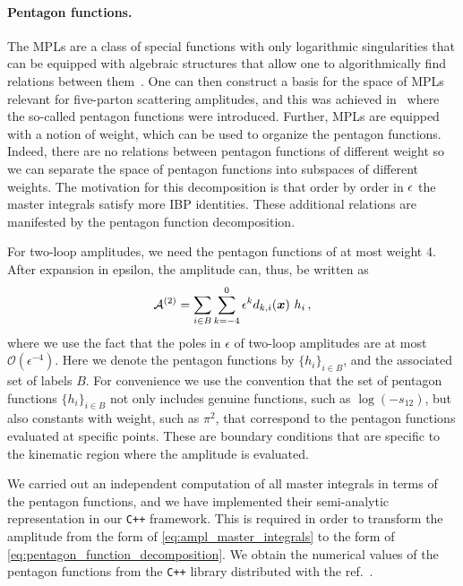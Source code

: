 \paragraph{Pentagon functions.}
The MPLs are a class of special functions with 
only logarithmic singularities that can be equipped with algebraic
structures that allow one to algorithmically find relations between
them~\cite{Goncharov:2010jf,Duhr:2011zq,Duhr:2012fh}. One can then
construct a basis for the space of MPLs relevant for five-parton
scattering amplitudes, and this was achieved in~\cite{Gehrmann:2018yef}
where the so-called pentagon functions were introduced.
Further, MPLs are equipped with a notion of weight, which can
be used to organize the pentagon functions. Indeed, there are
no relations between pentagon functions of different weight so we can
separate the space of pentagon functions into subspaces of different 
weights. 
The motivation for this decomposition is
that order by order in $\epsilon$ the master integrals satisfy more
IBP identities. These additional relations are manifested by the pentagon
function decomposition.

For two-loop amplitudes, we need the pentagon functions of at most weight 4.
After expansion in epsilon, the amplitude can, thus, be written as
\begin{equation} \label{eq:pentagon_function_decomposition}
  \mathcal{A}^{(2)}=
    \sum_{i\in B}\sum_{k=-4}^0\epsilon^{k}
    d_{k,i}(\vb*{x})~h_i\,,
\end{equation}
where we use the fact that the poles in $\epsilon$ of two-loop amplitudes are at most $\mathcal{O}(\epsilon^{-4})$.
Here we denote the pentagon functions by $\{h_i\}_{i\in B}$, and the associated set of labels $B$. 
For convenience we use the convention that the set of pentagon functions $\{h_i\}_{i\in B}$
not only includes genuine functions, such as $\log(-s_{12})$, but also
constants with weight, such as $\pi^2$, that correspond to the pentagon 
functions evaluated at specific points. These are boundary conditions that
are specific to the kinematic region where the amplitude is evaluated.

We carried out an independent computation of all master integrals in terms of the pentagon functions, and
we have implemented their semi-analytic representation in our \texttt{C++} framework. This is required  in order to 
transform the amplitude from the form of \cref{eq:ampl_master_integrals} to the form of \cref{eq:pentagon_function_decomposition}.
We obtain the numerical values of the pentagon functions from the \texttt{C++} library distributed with the ref.\ \cite{Gehrmann:2018yef}.

